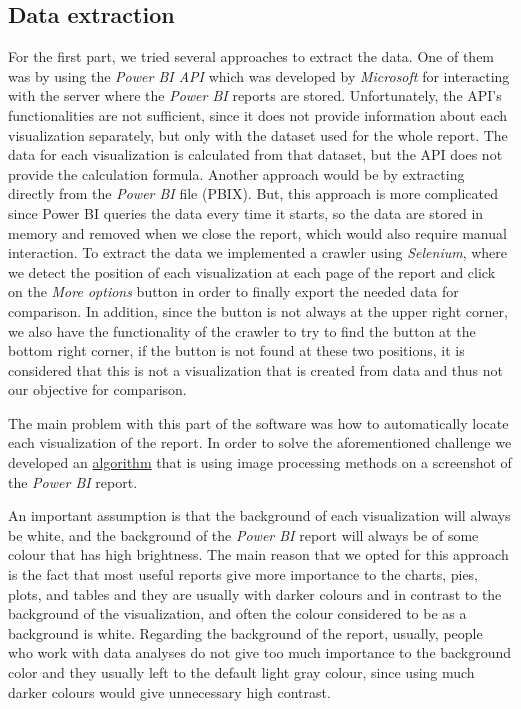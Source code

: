 \documentclass[fleqn,moreauthors,10pt]{ds_report}
\begin{document}
\subsection*{Data extraction}

For the first part, we tried several approaches to extract the data. One of them was by using the \textit{Power BI API} which was developed by \textit{Microsoft} for interacting with the server where the \textit{Power BI} reports are stored. Unfortunately, the API's functionalities are not sufficient, since it does not provide information about each visualization separately, but only with the dataset used for the whole report. The data for each visualization is calculated from that dataset, but the API does not provide the calculation formula. Another approach would be by extracting directly from the \textit{Power BI} file (PBIX). But, this approach is more complicated since Power BI queries the data every time it starts, so the data are stored in memory and removed when we close the report, which would also require manual interaction.
To extract the data we implemented a crawler using \textit{Selenium}, where we detect the position of each visualization at each page of the report and click on the \textit{More options} button in order to finally export the needed data for comparison. In addition, since the button is not always at the upper right corner, we also have the functionality of the crawler to try to find the button at the bottom right corner, if the button is not found at these two positions, it is considered that this is not a visualization that is created from data and thus not our objective for comparison.
\par
The main problem with this part of the software was how to automatically locate each visualization of the report. In order to solve the aforementioned challenge we developed an \hyperlink{algo1}{algorithm} that is using image processing methods on a screenshot of the \textit{Power BI} report.
\par

An important assumption is that the background of each visualization will always be white, and the background of the \textit{Power BI} report will always be of some colour that has high brightness. The main reason that we opted for this approach is the fact that most useful reports give more importance to the charts, pies, plots, and tables and they are usually with darker colours and in contrast to the background of the visualization, and often the colour considered to be as a background is white. Regarding the background of the report, usually, people who work with data analyses do not give too much importance to the background color and they usually left to the default light gray colour, since using much darker colours would give unnecessary high contrast.
\end{document}
